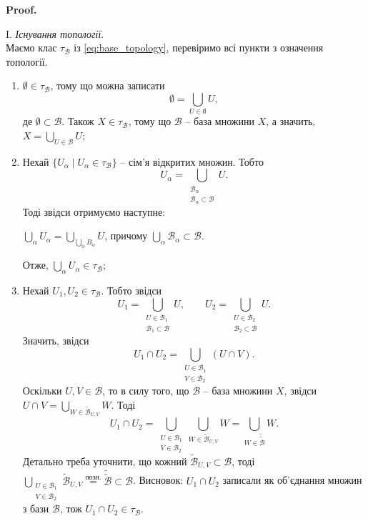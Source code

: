 \documentclass[a4paper, 10pt]{article}
\makeatletter
\theoremstyle{theoremdd}
\renewenvironment{proof}[1][Proof.\\]{\par
\pushQED{\hfill \qed}%
\normalfont \topsep6\p@\@plus6\p@\relax
\trivlist
\item\relax
{\bfseries
#1\@addpunct{.}}\hspace\labelsep\ignorespaces
}{%
\popQED\endtrivlist\@endpefalse
}
\makeatother
\begin{document}
\begin{proof}
I. \textit{Існування топології}.\\
Маємо клас $\tau_{\mathcal{B}}$ із \eqref{eq:base_topology}, перевіримо всі пункти з означення топології.
\begin{enumerate}[nosep,wide=0pt,label={\arabic*)}]
\item $\emptyset \in \tau_{\mathcal{B}}$, тому що можна записати 
\[
\emptyset = \displaystyle\bigcup_{U \in \emptyset} U,
\]
де $\emptyset \subset \mathcal{B}$. Також $X \in \tau_{\mathcal{B}}$, тому що $\mathcal{B}$ -- база множини $X$, а значить, $X = \displaystyle\bigcup_{U \in \mathcal{B}} U$;

\item Нехай $\{U_\alpha \mid U_\alpha \in \tau_{\mathcal{B}}\}$ -- сім'я відкритих множин. Тобто \[
U_\alpha = \displaystyle\bigcup_{\substack{\mathcal{B}_\alpha \\ \mathcal{B}_\alpha \subset \mathcal{B}}} U.
\] 
Тоді звідси отримуємо наступне:
\begin{center}
$\displaystyle\bigcup_\alpha U_\alpha = \bigcup_{\bigcup_\alpha B_\alpha} U$, причому $\displaystyle\bigcup_\alpha \mathcal{B}_\alpha \subset \mathcal{B}$.
\end{center}
Отже, $\displaystyle\bigcup_\alpha U_\alpha \in \tau_\mathcal{B}$;
\item Нехай $U_1,U_2 \in \tau_\mathcal{B}$. Тобто звідси
\[
U_1 = \displaystyle\bigcup_{\substack{U \in \mathcal{B}_1 \\ \mathcal{B}_1 \subset \mathcal{B}}} U, \qquad U_2 = \displaystyle\bigcup_{\substack{U \in \mathcal{B}_2 \\ \mathcal{B}_2 \subset \mathcal{B}}} U.
\]
Значить, звідси 
\[
U_1 \cap U_2 = \displaystyle\bigcup_{\substack{U \in \mathcal{B}_1 \\ V \in \mathcal{B}_2}} (U \cap V).
\]
Оскільки $U,V \in \mathcal{B}$, то в силу того, що $\mathcal{B}$ -- база множини $X$, звідси $U \cap V = \displaystyle\bigcup_{W \in \mathcal{\tilde{B}}_{U,V}} W$. Тоді 
\[
U_1 \cap U_2 = \displaystyle\bigcup_{\substack{U \in \mathcal{B}_1 \\ V \in \mathcal{B}_2}} \bigcup_{W \in \mathcal{\tilde{B}}_{U,V}} W = \displaystyle\bigcup_{W \in \mathcal{\tilde{\tilde{B}}}} W.
\]
Детально треба уточнити, що кожний $\mathcal{\tilde{B}}_{U,V} \subset \mathcal{B}$, тоді $\displaystyle\bigcup_{\substack{U \in \mathcal{B}_1 \\ V \in \mathcal{B}_2}} \mathcal{\tilde{B}}_{U,V} \overset{\text{позн.}}{=} \mathcal{\tilde{\tilde{B}}} \subset \mathcal{B}$. Висновок: $U_1 \cap U_2$ записали як об'єднання множин з бази $\mathcal{B}$, тож $U_1 \cap U_2 \in \tau_{\mathcal{B}}$.

\end{enumerate}
\end{proof}
\end{document}
